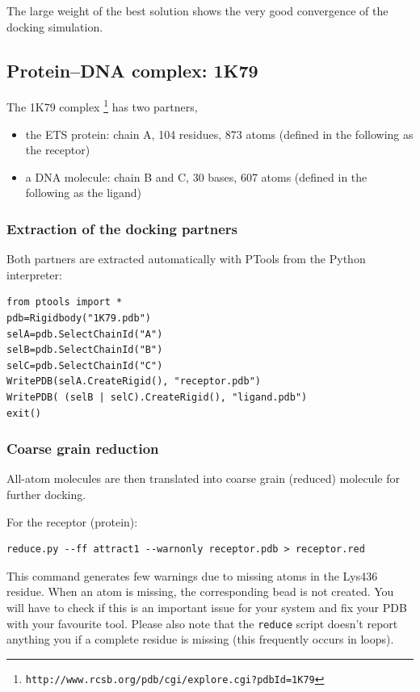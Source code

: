 \documentclass[12pt,a4paper]{article}
\begin{document}
The large weight of the best solution shows the very good convergence of the
docking simulation.

\subsection{Protein--DNA complex: 1K79}

The 1K79 complex \footnote{\tt http://www.rcsb.org/pdb/cgi/explore.cgi?pdbId=1K79} 
has two partners,
\begin{itemize}
\item the ETS protein: chain A, 104 residues, 873 atoms (defined in the following as the receptor)
\item a DNA molecule: chain B and C, 30 bases, 607 atoms (defined in the following as the ligand)
\end{itemize}

\subsubsection{Extraction of the docking partners}
Both partners are extracted automatically with PTools from the Python interpreter:
\begin{verbatim}
from ptools import *
pdb=Rigidbody("1K79.pdb")
selA=pdb.SelectChainId("A")
selB=pdb.SelectChainId("B")
selC=pdb.SelectChainId("C")
WritePDB(selA.CreateRigid(), "receptor.pdb")
WritePDB( (selB | selC).CreateRigid(), "ligand.pdb")
exit()
\end{verbatim}

\subsubsection{Coarse grain reduction}
All-atom molecules are then translated into coarse grain (reduced) molecule for further docking. 

For the receptor (protein): 
\begin{verbatim}
reduce.py --ff attract1 --warnonly receptor.pdb > receptor.red
\end{verbatim}

This command generates few warnings due to missing atoms in the Lys436 residue. When an atom is missing, the corresponding bead is not created. You will have to check if this is an important issue for your system and fix your PDB with your favourite tool. Please also note that the \verb!reduce! script doesn't report anything you if a complete residue is missing (this frequently occurs in loops).
\end{document}
